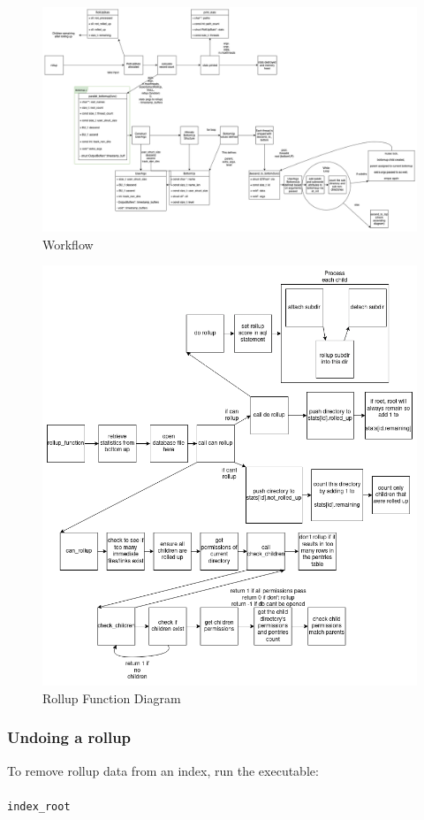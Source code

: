 \begin{figure} [!htb]
  \centering \includegraphics[width=\textwidth]{images/rollup.png}
  \caption{\rollup Workflow}
  \label{fig:rollupworkflow}
\end{figure}

\begin{figure} [!htb]
  \centering
  \includegraphics[width=\textwidth]{images/rollup_function.png}
  \caption{Rollup Function Diagram}
  \label{fig:rollupfunction}
\end{figure}

\subsubsection{Undoing a rollup}
To remove rollup data from an index, run the \unrollup executable:
\\\\
\indent \unrollup \texttt{index\_root}
